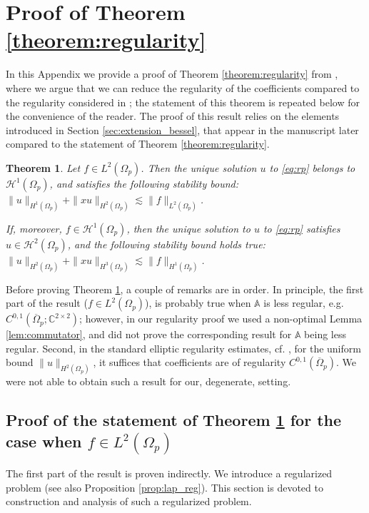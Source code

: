 \documentclass[report]{elsarticle}
\newtheorem{theorem}{Theorem}[section]
\numberwithin{theorem}{section}
\begin{document}
\section{Proof of Theorem \ref{theorem:regularity}}
\label{appendix:regularity_proof}
In this Appendix we provide a proof of Theorem \ref{theorem:regularity} from \cite{baouendi_goulaouic}, where we argue that we can reduce the regularity of the coefficients compared to the regularity considered in \cite{baouendi_goulaouic}; the statement of this theorem is repeated below for the convenience of the reader. The proof of this result relies on the elements  introduced in Section \ref{sec:extension_bessel}, that appear in the manuscript later compared to the statement of Theorem \ref{theorem:regularity}. 


\begin{theorem}
	\label{theorem:regularity_appendix}
		Let $f\in L^2(\Omega_p)$. Then the unique solution $u$ to  \eqref{eq:rp} belongs to $\mathcal{H}^1(\Omega_p)$, and satisfies the following stability bound: $\|u\|_{H^1(\Omega_p)}+\| x  u\|_{H^2(\Omega_p)}\lesssim \|f\|_{L^2(\Omega_p)}$. 

If, moreover, $f\in \mathcal{H}^1(\Omega_p)$, then the unique solution to $u$ to  \eqref{eq:rp} satisfies $u\in \mathcal{H}^2(\Omega_p)$, and the following stability bound holds true: $\|u\|_{H^2(\Omega_p)}+\|xu\|_{H^3(\Omega_p)}\lesssim \|f\|_{H^1(\Omega_p)}$. 
	
\end{theorem}
Before proving Theorem \ref{theorem:regularity_appendix}, a couple of remarks are in order. In principle, the first part of the result ($f\in L^2(\Omega_p)$), is probably true when $\mathbb{A}$ is less regular, e.g. $C^{0,1}(\overline{\Omega}_p; \mathbb{C}^{2\times 2})$; however, in our regularity proof we used a non-optimal Lemma \ref{lem:commutator}, and did not prove the corresponding result for $\mathbb{A}$ being less regular.
Second, in the standard elliptic regularity estimates, cf. \cite[Theorem 4.18]{mclean}, for the uniform bound $\|u\|_{H^2(\Omega_p)}$, it suffices that coefficients are of regularity $C^{0,1}(\overline{\Omega}_p)$. We were not able to obtain such a result for our, degenerate, setting.



 
\subsection{Proof of the statement of Theorem \ref{theorem:regularity_appendix} for the case when $f\in L^2(\Omega_p)$}
The first part of the result is proven indirectly. 
We introduce a regularized problem (see also Proposition \ref{prop:lap_reg}). This section is devoted to construction and analysis of such a regularized problem. 
\end{document}
